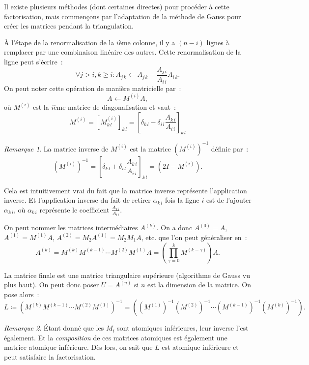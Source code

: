 \documentclass{article}
\theoremstyle{definition}
\theoremstyle{remark}
\newtheorem*{rmq}{Remarque}
\begin{document}
		Il existe plusieurs méthodes (dont certaines directes) pour procéder à cette factorisation, mais commençons par l'adaptation de la méthode de Gauss pour
		créer les matrices pendant la triangulation.

		À l'étape de la renormalisation de la $i$ème colonne, il y a $(n-i)$ lignes à remplacer par une combinaison linéaire des autres. Cette renormalisation
		de la ligne peut s'écrire~:
		\[\forall j > i, k \geq i : A_{j\,k} \leftarrow A_{j\,k} - \frac {A_{j\,i}}{A_{i\,i}}A_{i\,k}.\]
		On peut noter cette opération de manière matricielle par~:
		\[A \leftarrow M^{(i)}A,\]
		où $M^{(i)}$ est la $i$ème matrice de diagonalisation et vaut~:
		\[M^{(i)} = \left[M^{(i)}_{k\,l}\right]_{k\,l} = \left[\delta_{k\,l} - \delta_{i\,l}\frac {A_{k\,i}}{A_{i\,i}}\right]_{k\,l}\]

		\begin{rmq} La matrice inverse de $M^{(i)}$ est la matrice $\left(M^{(i)}\right)^{-1}$ définie par~:
		\[\left(M^{(i)}\right)^{-1} = \left[\delta_{k\,l} + \delta_{i\,l}\frac {A_{k\,i}}{A_{i\,i}}\right]_{k\,l} = (2I - M^{(i)}).\]

		Cela est intuitivement vrai du fait que la matrice inverse représente l'application inverse. Et l'application inverse du fait de retirer $\alpha_{k\,i}$
		fois la ligne $i$ est de l'ajouter $\alpha_{k\,i}$, où $\alpha_{k\,i}$ représente le coefficient $\frac {A_{k\,i}}{A_{i\,i}}$.
		\end{rmq}
		
		On peut nommer les matrices intermédiaires $A^{(k)}$. On a donc $A^{(0)} = A$, $A^{(1)} = M^{(1)}A$, $A^{(2)} = M_2A^{(1)} = M_2M_1A$, etc. que l'on
		peut généraliser en~:
		\[A^{(k)} = M^{(k)}M^{(k-1)}\dotsm M^{(2)}M^{(1)}A = \left(\prod_{\gamma=0}^{k}M^{(k-\gamma)}\right)A.\]

		La matrice finale est une matrice triangulaire supérieure (algorithme de Gauss vu plus haut). On peut donc poser $U = A^{(n)}$ si $n$ est la dimension
		de la matrice. On pose alors~:
		\[L \coloneqq (M^{(k)}M^{(k-1)} \dotsm M^{(2)}M^{(1)})^{-1}
		= \left(\left(M^{(1)}\right)^{-1}\left(M^{(2)}\right)^{-1} \dotsm \left(M^{(k-1)}\right)^{-1}\left(M^{(k)}\right)^{-1}\right).\]

		\begin{rmq} Étant donné que les $M_i$ sont atomiques inférieures, leur inverse l'est également. Et la \emph{composition} de ces matrices atomiques
		est également une matrice atomique inférieure. Dès lors, on sait que $L$ est atomique inférieure et peut satisfaire la factorisation.
		\end{rmq}
\end{document}
